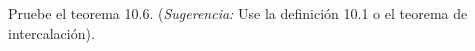 \item Pruebe el teorema 10.6. (\textit{Sugerencia:} Use la definición 10.1 o el teorema de intercalación).

